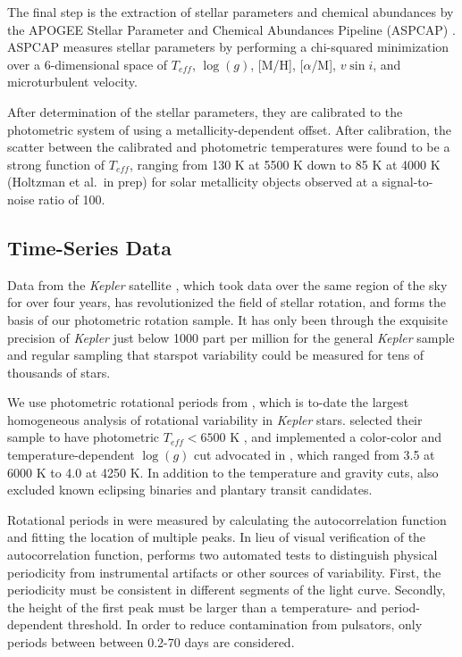 \documentclass[manuscript]{aastex6}
\newcommand{\vsini}{\ensuremath{v \sin i}}
\newcommand{\Kepler}{\mbox{\textit{Kepler}}}
\newcommand{\Teff}{\ensuremath{T_{eff}}}
\newcommand{\logg}{\ensuremath{\log(g)}}
\begin{document}
The final step is the extraction of stellar parameters and chemical abundances
by the APOGEE Stellar Parameter and Chemical Abundances Pipeline (ASPCAP)
\citep{GarciaPerez16}. ASPCAP measures stellar parameters by performing a
chi-squared minimization \citep{AllendePrieto06} over a 6-dimensional space of
\Teff, \logg, [M/H], [\(\alpha\)/M], \vsini, and microturbulent velocity.

After determination of the stellar parameters, they are calibrated to the
photometric system of \citet{GonzalezHernandez09} using a metallicity-dependent
offset. After calibration, the scatter between the calibrated and photometric
temperatures  were found to be a strong function of \Teff{}, ranging from 130 
K at 5500 K down to 85 K at 4000 K (Holtzman et al.\ in prep) for solar
metallicity objects observed at a signal-to-noise ratio of 100. 



\subsection{Time-Series Data}

Data from the \Kepler{} satellite \citep{Borucki10, Koch10}, which took data
over the same region of the sky for over four years, has revolutionized 
the field of stellar rotation, and forms the
basis of our photometric rotation sample. It has only been
through the exquisite precision of \Kepler{} just below 1000 part per million for
the general \Kepler{} sample and regular sampling that starspot variability 
could be measured for tens of thousands of stars.

We use photometric rotational periods from \citet{McQuillan14}, which is
to-date the largest homogeneous analysis of rotational variability in
\Kepler{} stars. \citet{McQuillan14} selected their sample to have photometric
\(\Teff < 6500\) K \citep{Brown11,Dressing13}, and implemented a color-color
and temperature-dependent \logg{} cut \citep{Brown11} advocated in
\citet{Ciardi11}, which ranged from 3.5 at 6000 K to 4.0 at 4250 K. 
In addition to the temperature and gravity cuts, \citet{McQuillan14} also 
excluded known eclipsing binaries and plantary
transit candidates. 

Rotational periods in \citet{McQuillan14} were measured by calculating the 
autocorrelation function and fitting the location of multiple peaks. In lieu of
visual verification of the autocorrelation function, \citet{McQuillan14}
performs two automated tests to distinguish physical periodicity from
instrumental artifacts or other sources of variability. First, the 
periodicity must be consistent in different segments of the light curve.
Secondly, the height of the first peak must be larger than a temperature- and
period-dependent threshold. In order to reduce contamination from pulsators, 
only periods between between 0.2-70 days are considered.
\end{document}
